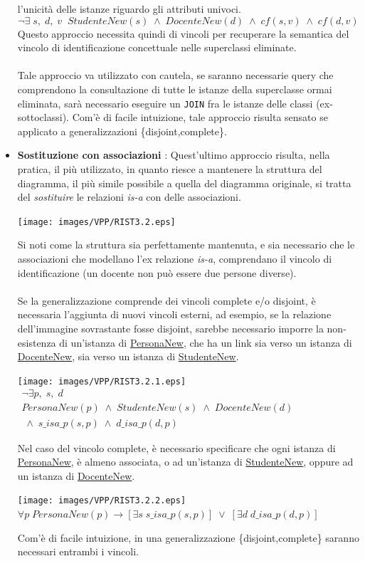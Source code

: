 \documentclass[12pt, letterpaper]{article}
\newcommand{\codee}[1]{\colorbox{white}{\texttt{#1}}}
\newcommand{\acc}{\\\hphantom{}\\}
\begin{document}
\begin{itemize}
    l'unicità delle istanze riguardo gli attributi univoci.$$
    \lnot \exists \;s,\; d,\; v\;\; StudenteNew(s) \;\land\; DocenteNew(d) \;\land\; cf(s, v) \;\land\; cf(d, v) $$
    Questo approccio necessita quindi di vincoli per recuperare la semantica del vincolo di identificazione 
    concettuale nelle superclassi eliminate.\acc  Tale approccio va utilizzato con cautela, se saranno necessarie 
    query che comprendono la consultazione di tutte le istanze della superclasse ormai eliminata, sarà necessario 
    eseguire un \codee{JOIN} fra le istanze delle classi (ex-sottoclassi). Com'è di facile intuizione, tale 
    approccio risulta sensato se applicato a generalizzazioni \{disjoint,complete\}.
    \item \textbf{Sostituzione con associazioni} : Quest'ultimo approccio risulta, nella pratica, il più 
    utilizzato, in quanto riesce a mantenere la struttura del diagramma, il più simile possibile a quella 
    del diagramma originale, si tratta del \textit{sostituire} le relazioni \textit{is-a} con 
    delle associazioni.\begin{center}
        \texttt{[image: images/VPP/RIST3.2.eps]}
    \end{center}
    Si noti come la struttura sia perfettamente mantenuta, e sia necessario che le associazioni che modellano 
    l'ex relazione \textit{is-a}, comprendano il vincolo di identificazione (un docente non può essere due 
    persone diverse).\acc 
    Se la generalizzazione comprende dei vincoli complete e/o disjoint, è necessaria l'aggiunta di nuovi vincoli 
    esterni, ad esempio, se la relazione dell'immagine sovrastante fosse disjoint, sarebbe necessario 
    imporre la non-esistenza di un'istanza di \underline{PersonaNew}, che ha un link sia verso un istanza 
    di  \underline{DocenteNew}, sia verso un istanza di  \underline{StudenteNew}.\begin{center}
        \texttt{[image: images/VPP/RIST3.2.1.eps]}
        $\begin{matrix}\lnot \exists p,\;s,\; d\;\; \\ PersonaNew(p) \;\land\; StudenteNew(s) \;\land\; DocenteNew(d)
         \\ \;\land\; s\_isa\_p(s, p) \;\land\; d\_isa\_p(d, p)\end{matrix}$
    \end{center}
    Nel caso del vincolo complete, è necessario specificare che ogni istanza di \underline{PersonaNew}, è 
   almeno associata, o ad un'istanza di \underline{StudenteNew}, oppure ad un istanza di \underline{DocenteNew}.
   \begin{center}
    \texttt{[image: images/VPP/RIST3.2.2.eps]}
    $\forall p\; PersonaNew(p) \rightarrow [\exists s\; s\_isa\_p(s, p)] \;\lor\; [\exists d\;  d\_isa\_p(d, p)]$
   \end{center}
   Com'è di facile intuizione, in una generalizzazione \{disjoint,complete\} saranno necessari entrambi i vincoli.
\end{itemize}
\end{document}
